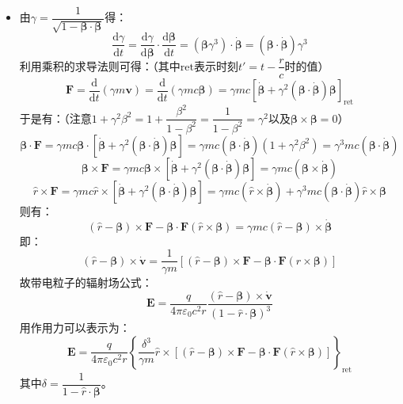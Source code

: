 \documentclass[a4paper,fontset=none]{ctexart}
\begin{document}
\begin{itemize}
    \item[7.(1)]
    \setcounter{equation}{0}
    由$\gamma=\dfrac{1}{\sqrt{1-\bm{\beta}\cdot\bm{\beta}}}$得：
    \[
        \frac{\mathrm{d}\gamma}{\mathrm{d}t} = \frac{\mathrm{d}\gamma}{\mathrm{d}\bm{\beta}} \cdot \frac{\mathrm{d}\bm{\beta}}{\mathrm{d}t} = (\bm{\beta}\gamma^3) \cdot \dot{\bm{\beta}} = (\bm{\beta} \cdot \dot{\bm{\beta}})\gamma^3
    \]
    利用乘积的求导法则可得：（其中$\mathrm{ret}$表示时刻$t'=t-\dfrac{r}{c}$时的值）
    \[
        \bm{F} = \frac{\mathrm{d}}{\mathrm{d}t}(\gamma m\bm{v}) = \frac{\mathrm{d}}{\mathrm{d}t}(\gamma mc\bm{\beta}) = \gamma mc\left[\dot{\bm{\beta}} + \gamma^2(\bm{\beta} \cdot \dot{\bm{\beta}})\bm{\beta}\right]_{\mathrm{ret}}
    \]
    于是有：（注意$1+\gamma^2\beta^2=1+\dfrac{\beta^2}{1-\beta^2}=\dfrac{1}{1-\beta^2}=\gamma^2$以及$\bm{\beta}\times\bm{\beta}=0$）
    \[
        \bm{\beta} \cdot \bm{F} = \gamma mc\bm{\beta} \cdot \left[\dot{\bm{\beta}} + \gamma^2(\bm{\beta} \cdot \dot{\bm{\beta}})\bm{\beta}\right] = \gamma mc (\bm{\beta} \cdot \dot{\bm{\beta}}) (1+\gamma^2\beta^2) = \gamma^3mc(\bm{\beta} \cdot \dot{\bm{\beta}})
    \]
    \[
        \bm{\beta} \times \bm{F} = \gamma mc\bm{\beta} \times \left[\dot{\bm{\beta}} + \gamma^2(\bm{\beta} \cdot \dot{\bm{\beta}})\bm{\beta}\right] = \gamma mc(\bm{\beta} \times \dot{\bm{\beta}})
    \]
    \[
        \hat{r} \times \bm{F} = \gamma mc\hat{r} \times \left[\dot{\bm{\beta}} + \gamma^2(\bm{\beta} \cdot \dot{\bm{\beta}})\bm{\beta}\right] = \gamma mc(\hat{r} \times \dot{\bm{\beta}}) + \gamma^3mc(\bm{\beta} \cdot \dot{\bm{\beta}})\hat{r} \times \bm{\beta}
    \]
    则有：
    \[
        (\hat{r}-\bm{\beta}) \times \bm{F} - \bm{\beta} \cdot \bm{F}(\hat{r} \times \bm{\beta}) = \gamma mc(\hat{r}-\bm{\beta}) \times \dot{\bm{\beta}}
    \]
    即：
    \begin{equation}
        (\hat{r}-\bm{\beta}) \times \dot{\bm{v}} = \frac{1}{\gamma m}\left[(\hat{r}-\bm{\beta}) \times \bm{F} - \bm{\beta} \cdot \bm{F}(\hat{r} \times \bm{\beta})\right]
    \end{equation}
    故带电粒子的辐射场公式：
    \[
        \bm{E} = \frac{q}{4\pi\varepsilon_0c^2r} \frac{(\hat{r}-\bm{\beta}) \times \dot{\bm{v}}}{(1 - \hat{r} \cdot \bm{\beta})^3}
    \]
    用作用力可以表示为：
    \[
        \bm{E} = \frac{q}{4\pi\varepsilon_0c^2r}\left\{\frac{\delta^3}{\gamma m}\hat{r} \times \left[(\hat{r}-\bm{\beta}) \times \bm{F} - \bm{\beta} \cdot \bm{F}(\hat{r} \times \bm{\beta})\right]\right\}_{\mathrm{ret}}
    \]
    其中$\delta=\dfrac{1}{1-\hat{r}\cdot\bm{\beta}}$。


\end{itemize}
\end{document}
